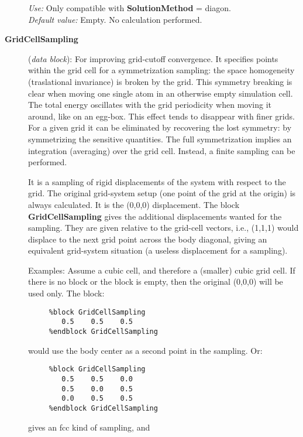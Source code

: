 \begin{description}
{\it Use:} Only compatible with {\bf SolutionMethod} = diagon.\\
{\it Default value:} Empty. No calculation performed.



\item[{\bf GridCellSampling}] ({\it data block}): 
For improving grid-cutoff convergence. It specifies points within
the grid cell for a symmetrization sampling: the space 
homogeneity (traslational invariance)
is broken by the grid. This symmetry breaking is clear
when moving one single atom in an otherwise empty simulation cell.
The total energy oscillates with the grid periodicity when moving
it around, like on an egg-box. This effect tends to disappear with 
finer grids. For a given grid it can be eliminated
by recovering the lost symmetry: by symmetrizing the sensitive
quantities. The full symmetrization implies an integration (averaging)
over the grid cell. Instead, a finite sampling can be performed.

It is a sampling of rigid displacements of the system with respect
to the grid. The original grid-system setup (one point of the grid
at the origin) is always calculated. It is the (0,0,0) displacement. 
The block {\bf GridCellSampling} gives the additional displacements
wanted for the sampling. They are given relative to the grid-cell 
vectors, i.e., (1,1,1) would displace to the next grid point across
the body diagonal, giving an equivalent grid-system situation
(a useless displacement for a sampling).

Examples: Assume a cubic cell, and therefore a (smaller) cubic grid cell.
If there is no block or the block is empty, then the original (0,0,0)
will be used only. The block: 

\begin{verbatim}
     %block GridCellSampling
        0.5    0.5    0.5
     %endblock GridCellSampling
\end{verbatim}

would use the body center as a second point in the sampling. Or:


\begin{verbatim}
     %block GridCellSampling
        0.5    0.5    0.0
        0.5    0.0    0.5
        0.0    0.5    0.5
     %endblock GridCellSampling
\end{verbatim}

gives an fcc kind of sampling, and



\end{description}
